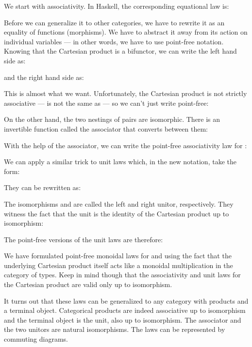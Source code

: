 We start with associativity. In Haskell, the corresponding equational
law is:

Before we can generalize it to other categories, we have to rewrite it
as an equality of functions (morphisms). We have to abstract it away
from its action on individual variables --- in other words, we have to
use point-free notation. Knowing that the Cartesian product is a
bifunctor, we can write the left hand side as:

and the right hand side as:

This is almost what we want. Unfortunately, the Cartesian product is not
strictly associative ---  is not the same as
 --- so we can't just write point-free:

On the other hand, the two nestings of pairs are isomorphic. There is an
invertible function called the associator that converts between them:

With the help of the associator, we can write the point-free
associativity law for :

We can apply a similar trick to unit laws which, in the new notation,
take the form:

They can be rewritten as:

The isomorphisms  and  are called the left
and right unitor, respectively. They witness the fact that the unit
\code{()} is the identity of the Cartesian product up to isomorphism:


The point-free versions of the unit laws are therefore:

We have formulated point-free monoidal laws for  and
 using the fact that the underlying Cartesian product itself
acts like a monoidal multiplication in the category of types. Keep in
mind though that the associativity and unit laws for the Cartesian
product are valid only up to isomorphism.

It turns out that these laws can be generalized to any category with
products and a terminal object. Categorical products are indeed
associative up to isomorphism and the terminal object is the unit, also
up to isomorphism. The associator and the two unitors are natural
isomorphisms. The laws can be represented by commuting diagrams.

\begin{figure}[H]
\centering
{}
\end{figure}

